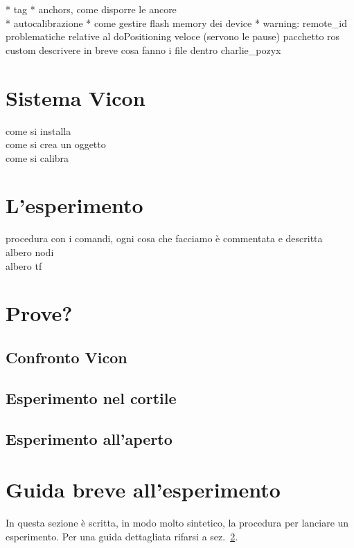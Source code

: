 * tag
* anchors, come disporre le ancore \\
* autocalibrazione
* come gestire flash memory dei device
* warning: remote\_id 
		problematiche relative al doPositioning veloce (servono le pause)
		pacchetto ros custom descrivere in breve cosa fanno i file dentro charlie\_pozyx

\section{Sistema Vicon}
\label{sez:Sistema Vicon}
come si installa \\
come si crea un oggetto\\
come si calibra

\section{L'esperimento}
\label{sez:L'esperimento}
procedura con i comandi, ogni cosa che facciamo \`e commentata e descritta \\
albero nodi\\
albero tf\\

\section{Prove?}
\subsection{Confronto Vicon}

\subsection{Esperimento nel cortile}

\subsection{Esperimento all'aperto}



\newpage
\section{Guida breve all'esperimento}
In questa sezione \`e scritta, in modo molto sintetico, la procedura per lanciare un esperimento. Per una guida dettagliata rifarsi a sez.~\ref{sez:L'esperimento}. 

